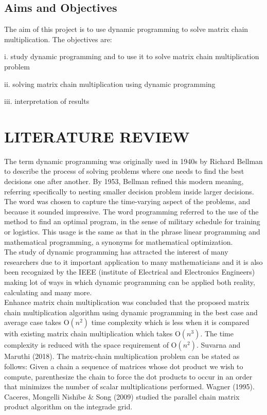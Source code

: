 \documentclass[12pt]{report}
\begin{document}
	\section{Aims and Objectives}
	The aim of this project is to  use dynamic programming to solve matrix chain multiplication. The objectives are:
	\begin{description}
		\item{i.} study dynamic programming and to use it to solve matrix chain multiplication problem
		\item{ii.} solving matrix chain multiplication using dynamic programming
		\item{iii.} interpretation of results
	\end{description}
	
	\newpage
	\chapter{LITERATURE REVIEW}
	The term dynamic programming was originally used in 1940s by Richard Bellman to describe the process of solving problems where one needs to find the best decisions one after another. By 1953, Bellman refined this modern meaning, referring specifically to nesting smaller decision problem inside larger decisions. The word was chosen to capture the time-varying aspect of the problems, and because it sounded impressive. The word programming referred to the use of the method to find an optimal program, in the sense of military schedule for training or logistics. This usage is the same as that in the phrase linear programming and mathematical programming, a synonyms for mathematical optimization.\\
	The study of dynamic programming has attracted the interest of many researchers due to it important application to many mathematicians and it is also been recognized by the IEEE (institute of Electrical and Electronics Engineers) making lot of ways in which dynamic programming can be applied both reality, calculating and many more.\\
	Enhance matrix chain multiplication was concluded that the proposed matrix chain multiplication algorithm using dynamic programming in the best case and average case takes O$(n^2)$ time complexity which is less when it is compared with existing matrix chain multiplication which takes O$(n^3)$. The time complexity is reduced with the space requirement of O$(n^2)$. Suvarna and Maruthi (2018).
	The matrix-chain multiplication problem can be stated as follows: Given a chain a sequence of matrices whose dot product we wish to compute, parenthesize the chain to force the dot products to occur in an order that minimizes the number of scalar multiplications performed. Wagner (1995). Caceres, Mongelli Nishibe & Song (2009) studied the parallel chain matrix product algorithm on the integrade grid.\\
\end{document}
